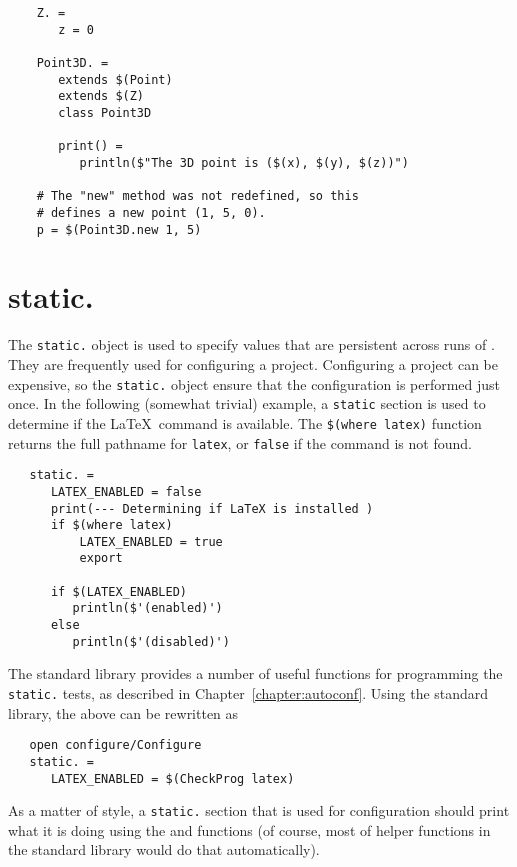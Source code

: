 \begin{verbatim}
    Z. =
       z = 0

    Point3D. =
       extends $(Point)
       extends $(Z)
       class Point3D

       print() =
          println($"The 3D point is ($(x), $(y), $(z))")

    # The "new" method was not redefined, so this
    # defines a new point (1, 5, 0).
    p = $(Point3D.new 1, 5)
\end{verbatim}

\section{static.}
\label{section:static.}

The \verb+static.+ object is used to specify values that are persistent across runs of \OMake{}.  They
are frequently used for configuring a project.  Configuring a project can be expensive, so the
\verb+static.+ object ensure that the configuration is performed just once.  In the following
(somewhat trivial) example, a \verb+static+ section is used to determine if the \LaTeX\ command is
available.  The \verb+$(where latex)+ function returns the full pathname for \verb+latex+, or
\verb+false+ if the command is not found.

\begin{verbatim}
   static. =
      LATEX_ENABLED = false
      print(--- Determining if LaTeX is installed )
      if $(where latex)
          LATEX_ENABLED = true
          export

      if $(LATEX_ENABLED)
         println($'(enabled)')
      else
         println($'(disabled)')
\end{verbatim}

The \OMake standard library provides a number of useful functions for
programming the \verb+static.+ tests, as described in
Chapter~\ref{chapter:autoconf}. Using the standard library, the above can
be rewritten as

\begin{verbatim}
   open configure/Configure
   static. =
      LATEX_ENABLED = $(CheckProg latex)
\end{verbatim}

As a matter of style, a \verb+static.+ section that is used for configuration should print what it
is doing using the  and
 functions (of course, most of helper functions in
the standard library would do that automatically).

